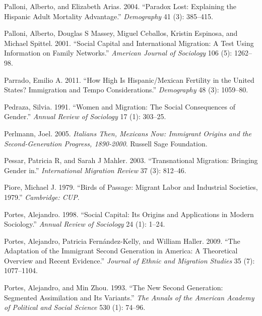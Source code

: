 \documentclass[
]{article}
\begin{document}
\leavevmode\hypertarget{ref-palloni2004paradox}{}%
Palloni, Alberto, and Elizabeth Arias. 2004. ``Paradox Lost: Explaining
the Hispanic Adult Mortality Advantage.'' \emph{Demography} 41 (3):
385--415.

\leavevmode\hypertarget{ref-palloni2001social}{}%
Palloni, Alberto, Douglas S Massey, Miguel Ceballos, Kristin Espinosa,
and Michael Spittel. 2001. ``Social Capital and International Migration:
A Test Using Information on Family Networks.'' \emph{American Journal of
Sociology} 106 (5): 1262--98.

\leavevmode\hypertarget{ref-parrado2011high}{}%
Parrado, Emilio A. 2011. ``How High Is Hispanic/Mexican Fertility in the
United States? Immigration and Tempo Considerations.'' \emph{Demography}
48 (3): 1059--80.

\leavevmode\hypertarget{ref-pedraza1991women}{}%
Pedraza, Silvia. 1991. ``Women and Migration: The Social Consequences of
Gender.'' \emph{Annual Review of Sociology} 17 (1): 303--25.

\leavevmode\hypertarget{ref-perlmann2005italians}{}%
Perlmann, Joel. 2005. \emph{Italians Then, Mexicans Now: Immigrant
Origins and the Second-Generation Progress, 1890-2000}. Russell Sage
Foundation.

\leavevmode\hypertarget{ref-pessar2003transnational}{}%
Pessar, Patricia R, and Sarah J Mahler. 2003. ``Transnational Migration:
Bringing Gender in.'' \emph{International Migration Review} 37 (3):
812--46.

\leavevmode\hypertarget{ref-piore1979birds}{}%
Piore, Michael J. 1979. ``Birds of Passage: Migrant Labor and Industrial
Societies, 1979.'' \emph{Cambridge: CUP}.

\leavevmode\hypertarget{ref-portes1998social}{}%
Portes, Alejandro. 1998. ``Social Capital: Its Origins and Applications
in Modern Sociology.'' \emph{Annual Review of Sociology} 24 (1): 1--24.

\leavevmode\hypertarget{ref-portes2009adaptation}{}%
Portes, Alejandro, Patricia Fernández-Kelly, and William Haller. 2009.
``The Adaptation of the Immigrant Second Generation in America: A
Theoretical Overview and Recent Evidence.'' \emph{Journal of Ethnic and
Migration Studies} 35 (7): 1077--1104.

\leavevmode\hypertarget{ref-portes1993new}{}%
Portes, Alejandro, and Min Zhou. 1993. ``The New Second Generation:
Segmented Assimilation and Its Variants.'' \emph{The Annals of the
American Academy of Political and Social Science} 530 (1): 74--96.
\end{document}
